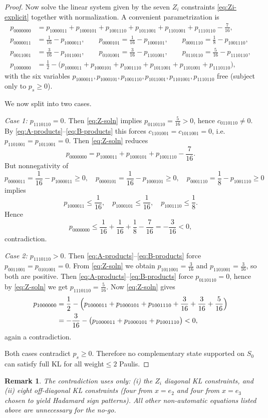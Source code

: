 \documentclass[11pt]{article}
\newtheorem{remark}{Remark}
\begin{document}
\begin{proof}
Now solve the linear system given by the seven $Z_i$ constraints \eqref{eq:Zi-explicit} together with normalization.
A convenient parametrization is
\begin{align}
p_{0000000}&=p_{1000011}+p_{1000101}+p_{1001110}+p_{1011001}+p_{1101001}+p_{1110110}-\frac{7}{16},\nonumber\\
p_{0000011}&=\frac{1}{16}-p_{1000011},\qquad
p_{0000101}=\frac{1}{16}-p_{1000101},\qquad
p_{0001110}=\frac{1}{8}-p_{1001110},\nonumber\\
p_{0011001}&=\frac{3}{16}-p_{1011001},\qquad
p_{0101001}=\frac{3}{16}-p_{1101001},\qquad
p_{0110110}=\frac{5}{16}-p_{1110110},\nonumber\\
p_{1000000}&=\frac12-\bigl(p_{1000011}+p_{1000101}+p_{1001110}+p_{1011001}+p_{1101001}+p_{1110110}\bigr),
\label{eq:Z-soln}
\end{align}
with the six variables
$p_{1000011},p_{1000101},p_{1001110},p_{1011001},p_{1101001},p_{1110110}$
free (subject only to $p_s\ge 0$).

We now split into two cases.

\smallskip
\noindent\emph{Case 1: $p_{1110110}=0$.}
Then \eqref{eq:Z-soln} implies $p_{0110110}=\frac{5}{16}>0$, hence $c_{0110110}\neq 0$.
By \eqref{eq:A-products}--\eqref{eq:B-products} this forces $c_{1101001}=c_{1011001}=0$, i.e.\ $p_{1101001}=p_{1011001}=0$.
Then \eqref{eq:Z-soln} reduces
\[
p_{0000000}=p_{1000011}+p_{1000101}+p_{1001110}-\frac{7}{16}.
\]
But nonnegativity of
\[
p_{0000011}=\frac{1}{16}-p_{1000011}\ge0,\quad
p_{0000101}=\frac{1}{16}-p_{1000101}\ge0,\quad
p_{0001110}=\frac{1}{8}-p_{1001110}\ge0
\]
implies
\[
p_{1000011}\le\frac{1}{16},\quad p_{1000101}\le\frac{1}{16},\quad p_{1001110}\le\frac{1}{8}.
\]
Hence
\[
p_{0000000}\le \frac{1}{16}+\frac{1}{16}+\frac{1}{8}-\frac{7}{16}
= -\frac{3}{16}<0,
\]
contradiction.

\smallskip
\noindent\emph{Case 2: $p_{1110110}>0$.}
Then \eqref{eq:A-products}--\eqref{eq:B-products} force $p_{0011001}=p_{0101001}=0$.
From \eqref{eq:Z-soln} we obtain $p_{1011001}=\frac{3}{16}$ and $p_{1101001}=\frac{3}{16}$, so both are positive.
Then \eqref{eq:A-products}--\eqref{eq:B-products} force $p_{0110110}=0$, hence by \eqref{eq:Z-soln} we get $p_{1110110}=\frac{5}{16}$.
Now \eqref{eq:Z-soln} gives
\[
\begin{aligned}
p_{1000000}
&=\frac12-\Bigl(p_{1000011}+p_{1000101}+p_{1001110}+\frac{3}{16}+\frac{3}{16}+\frac{5}{16}\Bigr)\\
&=-\frac{3}{16}-\bigl(p_{1000011}+p_{1000101}+p_{1001110}\bigr)<0,
\end{aligned}
\]
again a contradiction.

\smallskip
Both cases contradict $p_s\ge 0$. Therefore no complementary state supported on $S_0$ can satisfy full KL for all weight$\le 2$ Paulis.
\end{proof}

\begin{remark}
The contradiction uses only:
(i) the $Z_i$ diagonal KL constraints, and
(ii) eight off-diagonal KL constraints (four from $x=e_2$ and four from $x=e_3$ chosen to yield Hadamard sign patterns).
All other non-automatic equations listed above are unnecessary for the no-go.
\end{remark}
\end{document}
